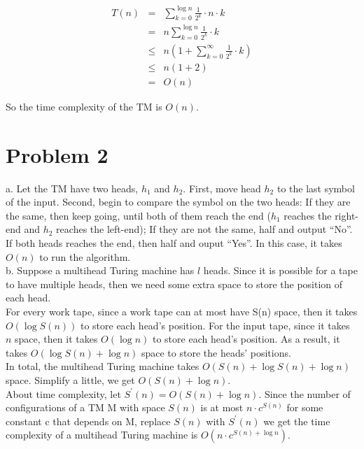 \documentclass[12pt]{article}
\begin{document}
\begin{eqnarray}
  T(n) &=&    \sum_{k = 0}^{\log n} {\frac {1}{2^k} \cdot n \cdot k}
              \nonumber \\
       &=&  n \sum_{k = 0}^{\log n} {\frac {1}{2^k} \cdot k} 
              \nonumber \\
       &\leq& n (1 + \sum_{k = 0}^{\infty} {\frac {1}{2^k} \cdot k}) 
              \nonumber \\
       &\leq& n (1 + 2) \nonumber \\
       &=&    O(n)
\end{eqnarray}

So the time complexity of the TM is $O(n)$.

\section*{Problem 2}

a. Let the TM have two heads, $h_1$ and $h_2$. First, move head
$h_2$ to the last symbol of the input. Second, begin to compare the
symbol on the two heads: If they are the same, then keep going, until
both of them reach the end ($h_1$ reaches the right-end and $h_2$
reaches the left-end); If they are not the same, half and output
``No''. If both heads reaches the end, then half and ouput ``Yes''. In
this case, it takes $O(n)$ to run the algorithm.\\

b. Suppose a multihead Turing machine has $l$ heads. Since it is
possible for a tape to have multiple heads, then we need some extra
space to store the position of each head.\\

For every work tape, since a work tape can at most have S(n) space,
then it takes $O(\log {S(n)})$ to store each head's position. For the
input tape, since it takes $n$ space, then it takes $O(\log {n})$ to
store each head's position. As a result, it takes $O(\log {S(n)} +
\log {n})$ space to store the heads' positions.\\

In total, the multihead Turing machine takes $O(S(n) + \log {S(n)} +
\log {n})$ space. Simplify a little, we get $O(S(n) + \log {n})$.\\

About time complexity, let $S^{'}(n) = O(S(n) + \log {n})$. Since
the number of configurations of a TM M with space $S(n)$ is at most
$n \cdot c^{S(n)}$ for some constant c that depends on M, replace
$S(n)$ with $S^{'}(n)$ we get the time complexity of a multihead
Turing machine is $O(n \cdot c^{S(n) + \log {n}})$.
\end{document}
